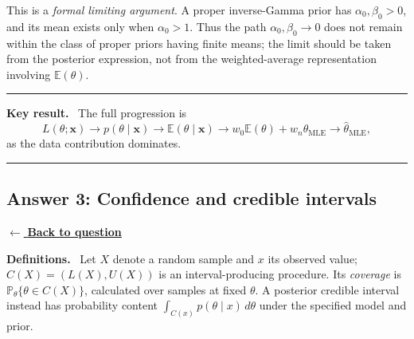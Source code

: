 \documentclass[11pt,a4paper]{article}
\newcommand{\given}{\mathrel{|}}
\newcommand{\xvec}{\boldsymbol{x}}
\newcommand{\E}{\mathbb{E}}
\newcommand{\answernav}[1]{%
  \label{answer:#1}%
  \noindent\hyperref[question:#1]{$\leftarrow$ \textbf{Back to question}}%
  \par\smallskip}
\newcommand{\studyheading}[1]{%
  \par\medskip\noindent\textcolor{statblue}{\textbf{#1.}}\ }
\newenvironment{keyresult}
  {\begin{center}\begin{minipage}{0.92\linewidth}\color{statblue}%
   \hrule\vspace{6pt}\textbf{Key result.}\ }
  {\vspace{6pt}\hrule\end{minipage}\end{center}}
\begin{document}
This is a \emph{formal limiting argument}. A proper inverse-Gamma prior has
$\alpha_0,\beta_0>0$, and its mean exists only when $\alpha_0>1$. Thus the
path $\alpha_0,\beta_0\to0$ does not remain within the class of proper priors
having finite means; the limit should be taken from the posterior expression,
not from the weighted-average representation involving $\E(\theta)$.

\begin{keyresult}
The full progression is
\[
  \boxed{
    L(\theta;\xvec)
    \longrightarrow
    p(\theta\given\xvec)
    \longrightarrow
    \E(\theta\given\xvec)
    \longrightarrow
    w_0\E(\theta)+w_n\widehat{\theta}_{\mathrm{MLE}}
    \longrightarrow
    \widehat{\theta}_{\mathrm{MLE}}
  },
\]
as the data contribution dominates.
\end{keyresult}

\clearpage

\subsection{Answer 3: Confidence and credible intervals}
\answernav{3}

\studyheading{Definitions}
Let $X$ denote a random sample and $x$ its observed value; $C(X)=(L(X),U(X))$ is an interval-producing procedure.
Its \emph{coverage} is $\mathbb P_\theta\{\theta\in C(X)\}$, calculated over samples at fixed $\theta$.
A posterior credible interval instead has probability content
$\int_{C(x)}p(\theta\given x)\,d\theta$ under the specified model and prior.
\end{document}
